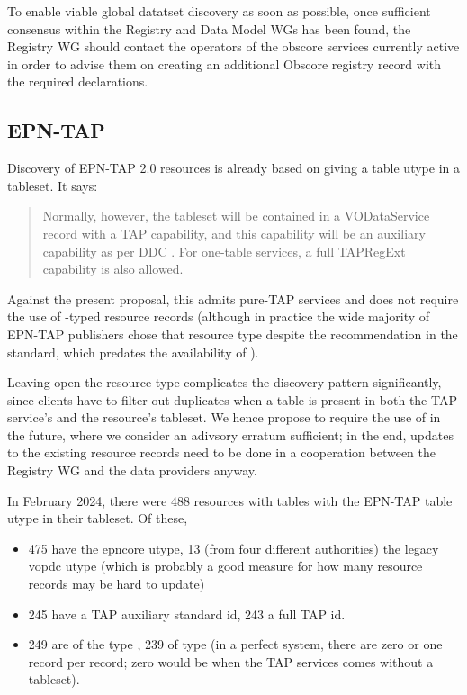 \documentclass[11pt,a4paper]{ivoa}
\begin{document}
To enable viable global datatset discovery as soon as possible, once
sufficient consensus within the Registry and Data Model WGs has been
found, the Registry WG should contact the operators of
the obscore services currently active in order to advise them on
creating an additional Obscore registry record with the required
declarations.

\subsection{EPN-TAP}

Discovery of EPN-TAP 2.0 \citep{2022ivoa.spec.0822E} resources is
already based on giving a table utype in a tableset.  It says:

\begin{quotation}
\noindent Normally, however, the
tableset will be contained in a VODataService 
record with a TAP capability, and this capability will be an auxiliary
capability as per DDC \citep{2019ivoa.spec.0520D}.  For one-table
services, a full TAPRegExt \citep{2012ivoa.spec.0827D} capability is also
allowed.
\end{quotation}

Against the present proposal, this admits pure-TAP services and does not
require the use of -typed resource records
(although in practice the wide majority of EPN-TAP publishers chose
that resource type despite the recommendation in the standard, which
predates the availability of ).


Leaving open the resource type complicates
the discovery pattern significantly, since clients have
to filter out duplicates when a table is present in both the TAP
service's and the resource's tableset.  We hence propose to require the
use of  in the future,
where we consider an adivsory erratum sufficient;
in the end, updates to the existing resource records need to be done in
a cooperation between the Registry WG and the data providers anyway.

In February 2024, there were 488 resources with tables with the EPN-TAP
table utype in their tableset.  Of these,

\begin{itemize}
\item 475 have the epncore utype, 13 (from four different authorities)
the legacy vopdc utype (which is probably a good measure for how many
resource records may be hard to update)
\item 245 have a TAP auxiliary standard id, 243 a full TAP id.
\item 249 are of the type , 239 of type
 (in a perfect system, there are zero or one
 record per  record;
zero would be when the TAP services comes without a tableset).
\end{itemize}
\end{document}
